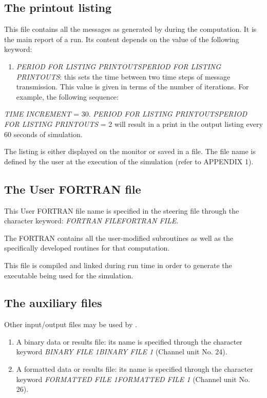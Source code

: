 \subsection{ The printout listing}

 This file contains all the messages as generated by \tomawac during the computation. It is the main report of a \tomawac run. Its content depends on the value of the following keyword:

\begin{enumerate}
\item  \textit{PERIOD FOR LISTING PRINTOUTSPERIOD FOR LISTING PRINTOUTS}: this sets the time between two time steps of message transmission. This value is given in terms of the number of iterations. For example, the following sequence:
\end{enumerate}

   \textit{TIME INCREMENT} = 30.    \textit{PERIOD FOR LISTING PRINTOUTSPERIOD FOR LISTING PRINTOUTS }= 2 will result in a print in the output listing every 60 seconds of simulation.

 The listing is either displayed on the monitor or saved in a file. The file name is defined by the user at the execution of the \tomawac simulation (refer to APPENDIX 1).


\subsection{ The User FORTRAN file}

 This User FORTRAN file name is specified in the steering file through the character keyword: \textit{FORTRAN FILEFORTRAN FILE}.\textit{}

 The FORTRAN contains all the user-modified \tomawac subroutines as well as the specifically developed routines for that computation.

 This file is compiled and linked during run time in order to generate the executable being used for the simulation.


\subsection{ The auxiliary files}

 Other input/output files may be used by \tomawac.

\begin{enumerate}
\item  A binary data or results file: its name is specified through the character keyword \textit{BINARY FILE 1BINARY FILE 1} (Channel unit No. 24).

\item  A formatted data or results file: its name is specified through the character keyword \textit{FORMATTED FILE 1FORMATTED FILE 1} (Channel unit No. 26).
\end{enumerate}

